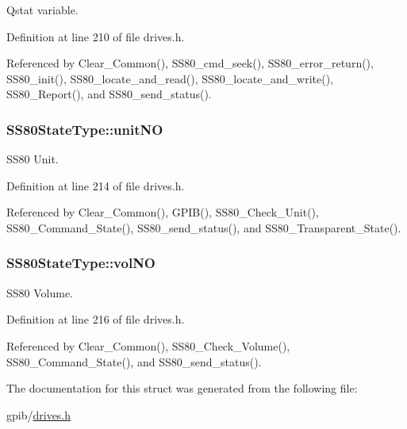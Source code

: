Qstat variable. 



Definition at line 210 of file drives.\+h.



Referenced by Clear\+\_\+\+Common(), S\+S80\+\_\+cmd\+\_\+seek(), S\+S80\+\_\+error\+\_\+return(), S\+S80\+\_\+init(), S\+S80\+\_\+locate\+\_\+and\+\_\+read(), S\+S80\+\_\+locate\+\_\+and\+\_\+write(), S\+S80\+\_\+\+Report(), and S\+S80\+\_\+send\+\_\+status().

\subsubsection[{\texorpdfstring{unit\+NO}{unitNO}}]{ S\+S80\+State\+Type\+::unit\+NO}\hypertarget{structSS80StateType_ad2b3cd5353f5650df931520a39b385e7}{}\label{structSS80StateType_ad2b3cd5353f5650df931520a39b385e7}


S\+S80 Unit. 



Definition at line 214 of file drives.\+h.



Referenced by Clear\+\_\+\+Common(), G\+P\+I\+B(), S\+S80\+\_\+\+Check\+\_\+\+Unit(), S\+S80\+\_\+\+Command\+\_\+\+State(), S\+S80\+\_\+send\+\_\+status(), and S\+S80\+\_\+\+Transparent\+\_\+\+State().

\subsubsection[{\texorpdfstring{vol\+NO}{volNO}}]{ S\+S80\+State\+Type\+::vol\+NO}\hypertarget{structSS80StateType_ac197866db7677ec4bf9ad5e29e4a58a3}{}\label{structSS80StateType_ac197866db7677ec4bf9ad5e29e4a58a3}


S\+S80 Volume. 



Definition at line 216 of file drives.\+h.



Referenced by Clear\+\_\+\+Common(), S\+S80\+\_\+\+Check\+\_\+\+Volume(), S\+S80\+\_\+\+Command\+\_\+\+State(), and S\+S80\+\_\+send\+\_\+status().



The documentation for this struct was generated from the following file\+:\begin{DoxyCompactItemize}
\item 
gpib/\hyperlink{drives_8h}{drives.\+h}\end{DoxyCompactItemize}
